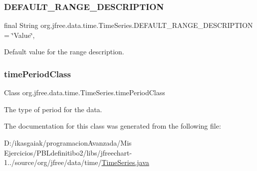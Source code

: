 \subsubsection{\texorpdfstring{D\+E\+F\+A\+U\+L\+T\+\_\+\+R\+A\+N\+G\+E\+\_\+\+D\+E\+S\+C\+R\+I\+P\+T\+I\+ON}{DEFAULT\_RANGE\_DESCRIPTION}}
{\footnotesize\ttfamily final String org.\+jfree.\+data.\+time.\+Time\+Series.\+D\+E\+F\+A\+U\+L\+T\+\_\+\+R\+A\+N\+G\+E\+\_\+\+D\+E\+S\+C\+R\+I\+P\+T\+I\+ON = \char`\"{}Value\char`\"{}\hspace{0.3cm}{\ttfamily [static]}, {\ttfamily [protected]}}

Default value for the range description. \mbox{\label{classorg_1_1jfree_1_1data_1_1time_1_1_time_series_a8451e52cd1e3aac5ee6bcd1f6e153a6f}} 
\subsubsection{\texorpdfstring{time\+Period\+Class}{timePeriodClass}}
{\footnotesize\ttfamily Class org.\+jfree.\+data.\+time.\+Time\+Series.\+time\+Period\+Class\hspace{0.3cm}{\ttfamily [protected]}}

The type of period for the data. 

The documentation for this class was generated from the following file\+:\begin{DoxyCompactItemize}
\item 
D\+:/ikasgaiak/programacion\+Avanzada/\+Mis Ejercicios/\+P\+B\+Ldefinitibo2/libs/jfreechart-\/1../source/org/jfree/data/time/\mbox{\hyperlink{_time_series_8java}{Time\+Series.\+java}}\end{DoxyCompactItemize}
